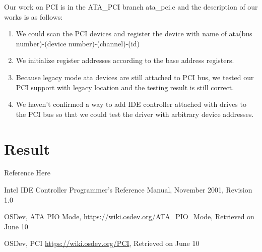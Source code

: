\documentclass[11pt]{article}
\begin{document}
Our work on PCI is in the ATA\_PCI branch ata\_pci.c and the description of our works is as follows: 

\begin{enumerate}
    \item We could scan the PCI devices and register the device with name of ata(bus number)-(device number)-(channel)-(id)
    \item We initialize register addresses according to the base address registers.
    \item Because legacy mode ata devices are still attached to PCI bus, we tested our PCI support with legacy location and the testing result is still correct.
    \item We haven’t confirmed a way to add IDE controller attached with drives to the PCI bus so that we could test the driver with arbitrary device addresses.
\end{enumerate}

\section{Result}

\newpage
\begin{thebibliography}{9}
Reference Here

Intel IDE Controller Programmer’s Reference Manual, November 2001, Revision 1.0

OSDev, ATA PIO Mode,
\url{https://wiki.osdev.org/ATA_PIO_Mode}, Retrieved on June 10

OSDev, PCI
\url{https://wiki.osdev.org/PCI}, Retrieved on June 10
\end{thebibliography}
\end{document}
